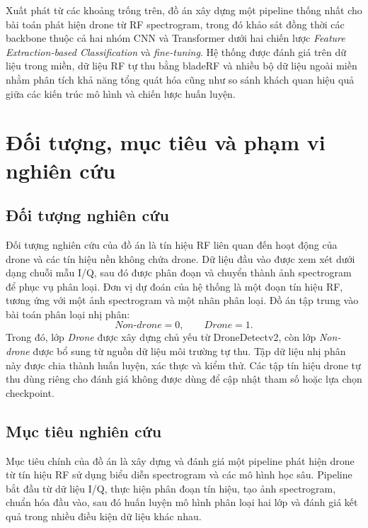 \documentclass[../DoAn.tex]{subfiles}
\begin{document}
Xuất phát từ các khoảng trống trên, đồ án xây dựng một pipeline thống nhất cho bài toán phát hiện drone từ RF spectrogram, trong đó khảo sát đồng thời các backbone thuộc cả hai nhóm CNN và Transformer dưới hai chiến lược \textit{Feature Extraction-based Classification} và \textit{fine-tuning}. Hệ thống được đánh giá trên dữ liệu trong miền, dữ liệu RF tự thu bằng bladeRF và nhiều bộ dữ liệu ngoài miền nhằm phân tích khả năng tổng quát hóa cũng như so sánh khách quan hiệu quả giữa các kiến trúc mô hình và chiến lược huấn luyện.

\section{Đối tượng, mục tiêu và phạm vi nghiên cứu}

\subsection{Đối tượng nghiên cứu}

Đối tượng nghiên cứu của đồ án là tín hiệu RF liên quan đến hoạt động của drone và các tín hiệu nền không chứa drone. Dữ liệu đầu vào được xem xét dưới dạng chuỗi mẫu I/Q, sau đó được phân đoạn và chuyển thành ảnh spectrogram để phục vụ phân loại. Đơn vị dự đoán của hệ thống là một đoạn tín hiệu RF, tương ứng với một ảnh spectrogram và một nhãn phân loại. Đồ án tập trung vào bài toán phân loại nhị phân:
\[
    \textit{Non-drone} = 0,\qquad
    \textit{Drone} = 1.
\]
Trong đó, lớp \textit{Drone} được xây dựng chủ yếu từ DroneDetectv2, còn lớp \textit{Non-drone} được bổ sung từ nguồn dữ liệu môi trường tự thu. Tập dữ liệu nhị phân này được chia thành huấn luyện, xác thực và kiểm thử. Các tập tín hiệu drone tự thu dùng riêng cho đánh giá không được dùng để cập nhật tham số hoặc lựa chọn checkpoint.

\subsection{Mục tiêu nghiên cứu}

Mục tiêu chính của đồ án là xây dựng và đánh giá một pipeline phát hiện drone từ tín hiệu RF sử dụng biểu diễn spectrogram và các mô hình học sâu. Pipeline bắt đầu từ dữ liệu I/Q, thực hiện phân đoạn tín hiệu, tạo ảnh spectrogram, chuẩn hóa đầu vào, sau đó huấn luyện mô hình phân loại hai lớp và đánh giá kết quả trong nhiều điều kiện dữ liệu khác nhau.
\end{document}
